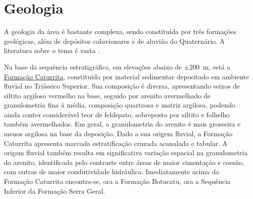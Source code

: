 \documentclass[final]{article}
\begin{document}
\section{Geologia}

A geologia da área é bastante complexa, sendo constituída por três formações geológicas, além de depósitos coluvionares e de aluvião do Quaternário. A literatura sobre o tema é vasta \cite{Bortoluzzi1974, Brasil1980, GasparettoEtAl1988, MacielFilho1990, PieriniEtAl2002, MarquesEtAl2005, Milani2005, Pinto2005, CPRM2007, Pedron2007, Sartori2009, NascimentoEtAl2010, WerlangEtAl2010, Machado2012, PedronEtAl2012}.


Na base da sequência estratigráfica, em elevações abaixo de $\pm$200~m, está a \href{http://pt.wikipedia.org/wiki/Forma\%C3\%A7\%C3\%A3o_Caturrita}{Formação Caturrita}, constituída por material sedimentar depositado em ambiente fluvial no Triássico Superior. Sua composição é diversa, apresentando seixos de siltito argiloso vermelho na base, seguido por arenito avermelhado de granulometria fina à média, composição quartzosa e matriz argilosa, podendo ainda conter considerável teor de feldspato, sobreposto por siltito e folhelho também avermelhados. Em geral, a granulometria do arenito é mais grosseira e menos argilosa na base da deposição. Dado a sua origem fluvial, a Formação Caturrita apresenta marcada estratificação cruzada acanalada e tabular. A origem fluvial também resulta em significativa variação espacial na granulometria do arenito, identificada pelo contraste entre áreas de maior cimentação e coesão, com outras de maior condutividade hidráulica. Imediatamente acima da Formação Caturrita encontra-se, ora a Formação Botucatu, ora a Sequência Inferior da Formação Serra Geral.

\end{document}
